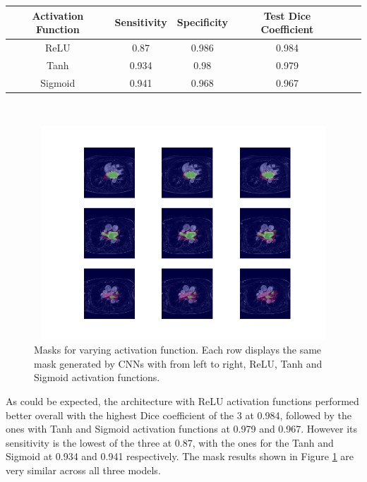 {
\centering
\begin{tabular}{cccccc}
\rowcolor[HTML]{C0C0C0} 
Activation Function & Sensitivity & Specificity & Test Dice Coefficient \\ \hline
\rowcolor[HTML]{FFFFFF} 
ReLU                                                          & 0.87        & 0.986       & 0.984                                                        \\
\rowcolor[HTML]{FFFFFF} 
Tanh                                                          & 0.934       & 0.98        & 0.979                                                        \\
\rowcolor[HTML]{FFFFFF} 
Sigmoid                                                       & 0.941       & 0.968       & 0.967                                                       
\end{tabular}\\
\vspace{0.5cm}
}

\begin{figure}
\centering
\includegraphics[trim=2.5cm 1.5cm 2cm 1.5cm, clip=true, height=80mm, width=150mm]{Chapter3/mask_results_varying_activation_function.png}
\caption{Masks for varying activation function. Each row displays the same mask generated by CNNs with from left to right, ReLU, Tanh and Sigmoid activation functions.}
\label{mask_varying_activation_function}
\end{figure}

\noindent As could be expected, the architecture with ReLU activation functions performed better overall with the highest Dice coefficient of the 3 at 0.984, followed by the ones with Tanh and Sigmoid activation functions at 0.979 and 0.967. However its sensitivity is the lowest of the three at 0.87, with the ones for the Tanh and Sigmoid at 0.934 and 0.941 respectively. The mask results shown in Figure \ref{mask_varying_activation_function} are very similar across all three models. \\

